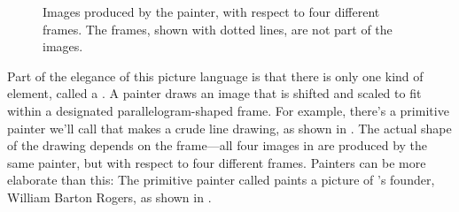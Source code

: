 \begin{figure}[tb]
	\centering
	
	\caption{
		Images produced by the  painter, with respect to four different frames.
		The frames, shown with dotted lines, are not part of the images.
	}
	\label{Figure 2.10}
\end{figure}

Part of the elegance of this picture language is that there is only one kind of element, called a .
A painter draws an image that is shifted and scaled to fit within a designated parallelogram-shaped frame.
For example, there’s a primitive painter we’ll call  that makes a crude line drawing, as shown in .
The actual shape of the drawing depends on the frame---all four images in  are produced by the same  painter, but with respect to four different frames.
Painters can be more elaborate than this:
The primitive painter called  paints a picture of ’s founder, William Barton Rogers, as shown in .%
